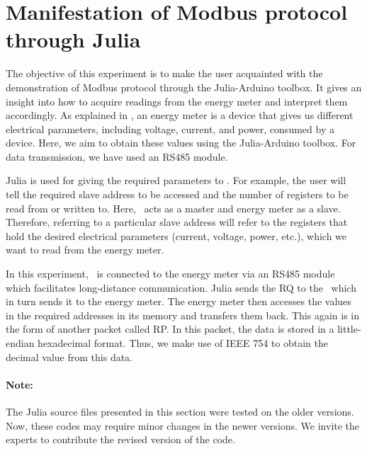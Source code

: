 
\section{Manifestation of Modbus protocol through Julia}
The objective of this experiment is to make the user acquainted with
the demonstration of Modbus protocol through the Julia-Arduino toolbox.
It gives an insight into how to acquire readings from the energy meter and interpret them accordingly. As explained in ,
an energy meter is a device that gives us different electrical parameters, including voltage, current, and power, consumed by a device.
Here, we aim to obtain these values using the Julia-Arduino toolbox. For data transmission, we have used an RS485 module.

Julia is used for giving the required parameters to \arduino. For
example, the user will tell the required slave address to be accessed
and the number of registers to be read from or written to. Here,
\arduino\ acts as a master and energy meter as a slave. Therefore,
referring to a particular slave address will refer to the registers
that hold the desired electrical parameters (current, voltage, power, etc.), which we want to read from the energy meter.

In this experiment, \arduino\ is connected to the energy meter via an RS485 module which facilitates long-distance communication.
Julia sends the RQ to the \arduino\, which in turn sends it to the
energy meter. The energy meter then accesses the values in the
required addresses in its memory and transfers them back. This again
is in the form of another packet called RP. In this packet, the data is stored in a little-endian hexadecimal format. Thus, we make use of IEEE 754 to obtain the decimal value from this data.

\paragraph{Note: } The Julia source files presented in this section were tested on the older versions. Now, these codes may require minor changes in
the newer versions. We invite the experts to contribute the revised version of the code.



